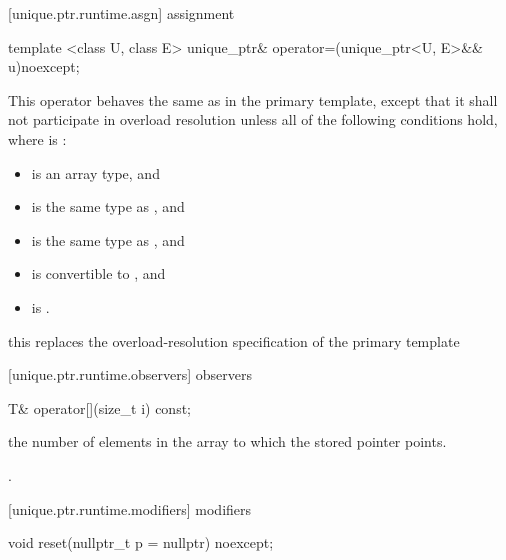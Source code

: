 [unique.ptr.runtime.asgn]{ assignment}

%
\begin{itemdecl}
template <class U, class E>
  unique_ptr& operator=(unique_ptr<U, E>&& u)noexcept;
\end{itemdecl}

\begin{itemdescr}
\pnum
This operator behaves the same as in the primary template,
except that it shall not participate in overload resolution
unless all of the following conditions hold,
where  is :

\begin{itemize}
\item {} is an array type, and
\item {} is the same type as , and
\item {} is the same type as , and
\item {} is convertible to , and
\item {} is .
\end{itemize}

\enternote
this replaces the overload-resolution specification of the primary template
\exitnote
\end{itemdescr}

[unique.ptr.runtime.observers]{ observers}

\begin{itemdecl}
T& operator[](size_t i) const;
\end{itemdecl}

\begin{itemdescr}
\pnum
\requires {} the
number of elements in the array to which
the stored pointer points.

\pnum
\returns {}.
\end{itemdescr}

[unique.ptr.runtime.modifiers]{ modifiers}

\begin{itemdecl}
void reset(nullptr_t p = nullptr) noexcept;
\end{itemdecl}

